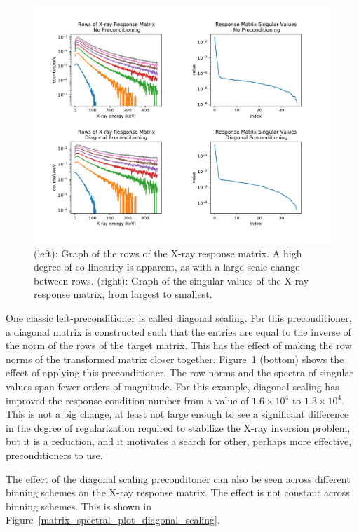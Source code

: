 \begin{figure}[p]
    \centering
    \includegraphics[width=1.1\textwidth]{figures/chapter_4/matrix_spectral_plot/fig.pdf}
    \caption{(left): Graph of the rows of the X-ray response matrix. A high degree of co-linearity is apparent, as with a large scale change between rows. (right): Graph of the singular values of the X-ray response matrix, from largest to smallest. }
    \label{matrix_spectral_plot}
\end{figure}

One classic left-preconditioner is called diagonal scaling. For this preconditioner, a diagonal matrix is constructed such that the entries are equal to the inverse of the norm of the rows of the target matrix. This has the effect of making the row norms of the transformed matrix closer together. Figure~\ref{matrix_spectral_plot} (bottom) shows the effect of applying this preconditioner. The row norms and the spectra of singular values span fewer orders of magnitude. For this example, diagonal scaling has improved the response condition number from a value of $1.6\times10^4$ to $1.3\times10^4$. This is not a big change, at least not large enough to see a significant difference in the degree of regularization required to stabilize the X-ray inversion problem, but it is a reduction, and it motivates a search for other, perhaps more effective, preconditioners to use. 

The effect of the diagonal scaling preconditoner can also be seen across different binning schemes on the X-ray response matrix. The effect is not constant across binning schemes. This is shown in Figure~\ref{matrix_spectral_plot_diagonal_scaling}.

